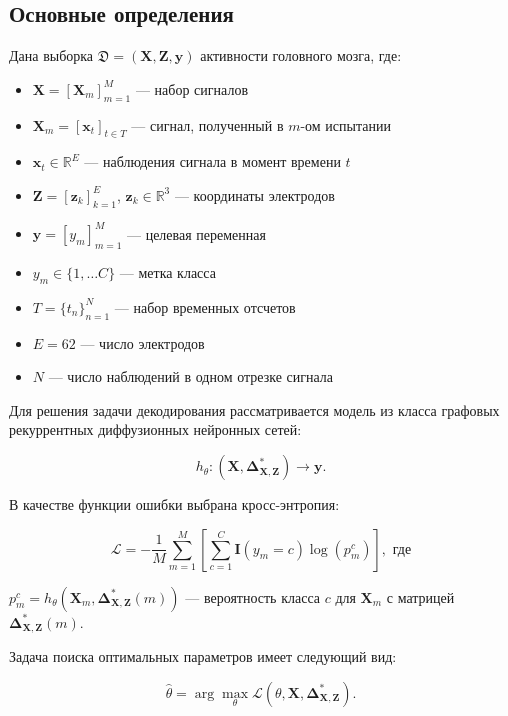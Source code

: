 \documentclass[12pt, twoside]{article}
\begin{document}
\subsection{Основные определения}
Дана выборка $\mathfrak{D} = (\mathbf{X}, \mathbf{Z}, \mathbf{y})$ активности головного мозга, где:
\begin{itemize}
    \item $\mathbf{X} = [\mathbf{X}_m]_{m=1}^M$ — набор сигналов
    \item $\mathbf{X}_m = [\mathbf{x}_t]_{t \in T}$ — сигнал, полученный в $m$-ом испытании
    \item $\mathbf{x}_t \in \mathbb{R}^E$ — наблюдения сигнала в момент времени $t$
    \item $\mathbf{Z} = [\mathbf{z}_k]_{k=1}^E$, $\mathbf{z}_k \in \mathbb{R}^3$ — координаты электродов
    \item $\mathbf{y} = [y_m]_{m=1}^M$ — целевая переменная
    \item $y_m \in \{1, \ldots C\}$ — метка класса
    \item $T = \{t_n\}_{n=1}^N$ — набор временных отсчетов
    \item $E = 62$ — число электродов
    \item $N$ — число наблюдений в одном отрезке сигнала
\end{itemize}

Для решения задачи декодирования рассматривается модель из класса графовых рекуррентных диффузионных нейронных сетей:

\begin{equation}
    h_\theta : (\mathbf{X}, \mathbf{\Delta}_{\mathbf{X},\mathbf{Z}}^*) \to \mathbf{y}.
\end{equation}

В качестве функции ошибки выбрана кросс-энтропия:

\begin{equation}
    \mathcal{L} = -\frac{1}{M} \sum_{m=1}^M \left[ \sum_{c=1}^C \mathbf{I}(y_m = c) \log(p_m^c) \right], \text{ где}
\end{equation}

$p_m^c = h_\theta \left( \mathbf{X}_m, \mathbf{\Delta}_{\mathbf{X},\mathbf{Z}}^*(m) \right)$ — вероятность класса $c$ для $\mathbf{X}_m$ с матрицей $\mathbf{\Delta}_{\mathbf{X},\mathbf{Z}}^*(m)$.

Задача поиска оптимальных параметров имеет следующий вид:

\begin{equation}
    \hat{\theta} = \arg \max_{\theta} \mathcal{L}(\theta, \mathbf{X}, \mathbf{\Delta}_{\mathbf{X},\mathbf{Z}}^*).
\end{equation}
\end{document}
